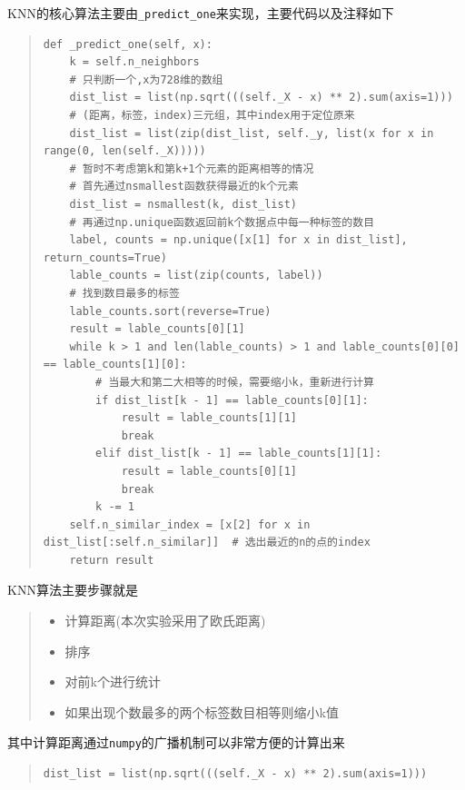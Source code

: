 \documentclass[UTF8]{ctexart}
\begin{document}
KNN的核心算法主要由\lstinline{_predict_one}来实现，主要代码以及注释如下



\begin{quote}
    \begin{lstlisting}[breaklines, title=\lstinline{_predict_one}方法]
def _predict_one(self, x):
    k = self.n_neighbors
    # 只判断一个,x为728维的数组
    dist_list = list(np.sqrt(((self._X - x) ** 2).sum(axis=1)))
    # (距离，标签，index)三元组，其中index用于定位原来
    dist_list = list(zip(dist_list, self._y, list(x for x in range(0, len(self._X)))))
    # 暂时不考虑第k和第k+1个元素的距离相等的情况
    # 首先通过nsmallest函数获得最近的k个元素
    dist_list = nsmallest(k, dist_list)
    # 再通过np.unique函数返回前k个数据点中每一种标签的数目
    label, counts = np.unique([x[1] for x in dist_list], return_counts=True)
    lable_counts = list(zip(counts, label))
    # 找到数目最多的标签
    lable_counts.sort(reverse=True)
    result = lable_counts[0][1]
    while k > 1 and len(lable_counts) > 1 and lable_counts[0][0] == lable_counts[1][0]:
        # 当最大和第二大相等的时候，需要缩小k，重新进行计算
        if dist_list[k - 1] == lable_counts[0][1]:
            result = lable_counts[1][1]
            break
        elif dist_list[k - 1] == lable_counts[1][1]:
            result = lable_counts[0][1]
            break
        k -= 1
    self.n_similar_index = [x[2] for x in dist_list[:self.n_similar]]  # 选出最近的n的点的index
    return result
    \end{lstlisting}
\end{quote}

\vspace*{2em}


KNN算法主要步骤就是
\begin{quote}
    \begin{itemize}
        \item 计算距离(本次实验采用了欧氏距离)
        \item 排序
        \item 对前k个进行统计
        \item 如果出现个数最多的两个标签数目相等则缩小k值
    \end{itemize}
\end{quote}

其中计算距离通过\lstinline{numpy}的广播机制可以非常方便的计算出来
\begin{quote}
    \begin{lstlisting}[breaklines, frame=tb, numbers=none]
dist_list = list(np.sqrt(((self._X - x) ** 2).sum(axis=1)))
    \end{lstlisting}
\end{quote}
\end{document}
